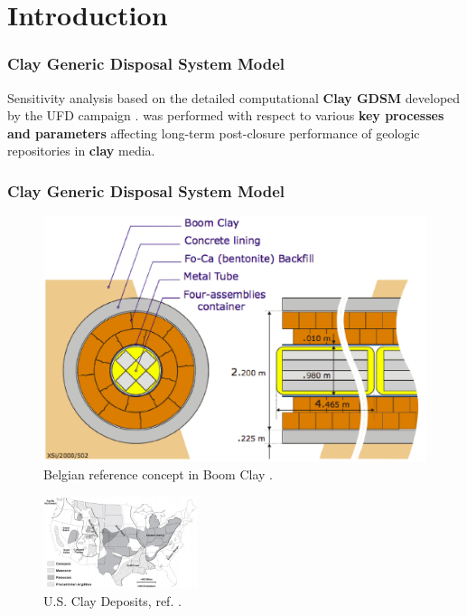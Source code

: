 
\section{Introduction}
\begin{frame}[c]
  \frametitle{Clay Generic Disposal System Model}
Sensitivity analysis based on the detailed computational \textbf{Clay 
  \gls{GDSM}} developed by the \gls{UFD} campaign \cite{clayton_generic_2011}.  
  was performed with respect to various \textbf{key processes and parameters} 
  affecting long-term post-closure performance of geologic repositories in 
  \textbf{clay} media.

\end{frame}

\begin{frame}[c]
  \frametitle{Clay Generic Disposal System Model}
     \begin{figure}[h!]
         \includegraphics[width=.4\textwidth]{belgianClayRedImp.eps}
         \caption{Belgian reference concept in Boom Clay 
         \cite{von_lensa_red-impact_2008}.}
     \end{figure}
     \begin{figure}[h!]
         \includegraphics[width=0.4\textwidth]{clayGonzales.eps}
         \caption{U.S. Clay Deposits, ref. \cite{gonzales_shales_1985}.}
     \end{figure}
   \hspace{0.01cm}
\end{frame}



